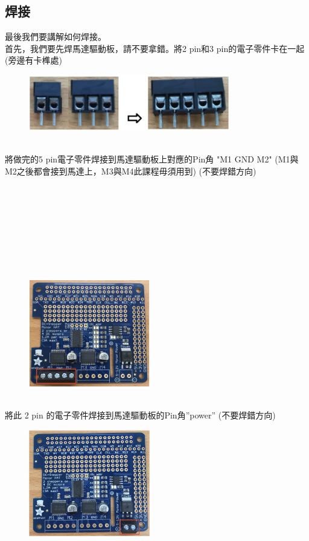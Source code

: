\documentclass{article}
\begin{document}
\subsection{焊接}
最後我們要講解如何焊接。
\\首先，我們要先焊馬達驅動板，請不要拿錯。將2 pin和3 pin的電子零件卡在一起(旁邊有卡榫處)
\\
\begin{figure}[htp]
    \begin{center}
        \includegraphics[width=250pt]{pic/1_1_6.png}
    \end{center}
\end{figure}
\\
將做完的5 pin電子零件焊接到馬達驅動板上對應的Pin角 "M1 GND M2" (M1與M2之後都會接到馬達上，M3與M4此課程毋須用到) (不要焊錯方向)
\\\\\\\\\\\\\\\\\\
\begin{figure}[htp]
    \begin{center}
        \includegraphics[width=150pt]{pic/1_1_7.png}
    \end{center}
\end{figure}
\\
將此 2 pin 的電子零件焊接到馬達驅動板的Pin角”power” (不要焊錯方向)
\\
\begin{figure}[htp]
    \begin{center}
        \includegraphics[width=150pt]{pic/1_1_8.png}
    \end{center}
\end{figure}
\end{document}
